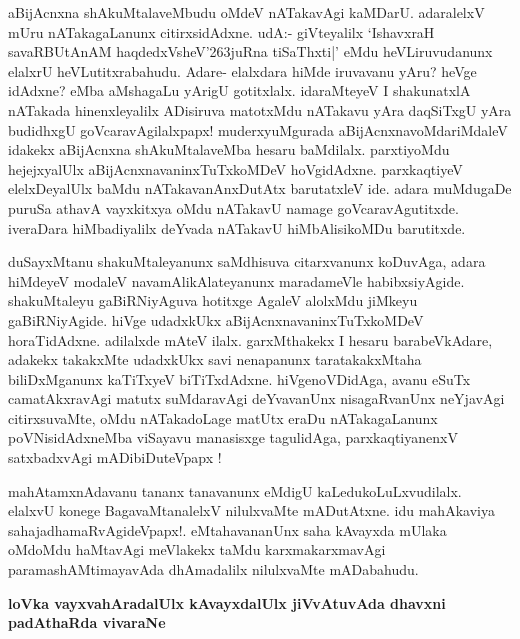 aBijAcnxna shAkuMtalaveMbudu oMdeV nATakavAgi kaMDarU. adaralelxV mUru nATakagaLanunx citirxsidAdxne. udA:- giVteyalilx `IshavxraH savaRBUtAnAM haqdedxVsheV\char'263juRna tiSaThxti|'\label{235} eMdu heVLiruvudanunx elalxrU heVLutitxrabahudu. Adare- elalxdara hiMde iruvavanu yAru? heVge idAdxne? eMba aMshagaLu yArigU gotitxlalx. idaraMteyeV I shakunatxlA nATakada hinenxleyalilx ADisiruva matotxMdu nATakavu yAra daqSiTxgU yAra budidhxgU goVcaravAgilalxpapx! muderxyuMgurada aBijAcnxnavoMdariMdaleV idakekx aBijAcnxna shAkuMtalaveMba hesaru baMdilalx. parxtiyoMdu hejejxyalUlx aBijAcnxnavaninxTuTxkoMDeV hoVgidAdxne. parxkaqtiyeV elelxDeyalUlx baMdu nATakavanAnxDutAtx barutatxleV ide. adara muMdugaDe puruSa athavA vayxkitxya oMdu nATakavU namage goVcaravAgutitxde. iveraDara hiMbadiyalilx deYvada nATakavU hiMbAlisikoMDu barutitxde.

duSayxMtanu shakuMtaleyanunx saMdhisuva citarxvanunx koDuvAga, adara hiMdeyeV modaleV navamAlikAlateyanunx maradameVle habibxsiyAgide. shakuMtaleyu gaBiRNiyAguva hotitxge AgaleV alolxMdu jiMkeyu gaBiRNiyAgide. hiVge udadxkUkx aBijAcnxnavaninxTuTxkoMDeV horaTidAdxne. adilalxde mAteV ilalx. garxMthakekx I hesaru barabeVkAdare, adakekx takakxMte udadxkUkx savi nenapanunx taratakakxMtaha biliDxMganunx kaTiTxyeV biTiTxdAdxne. hiVgenoVDidAga, avanu eSuTx camatAkxravAgi matutx suMdaravAgi deYvavanUnx nisagaRvanUnx neYjavAgi citirxsuvaMte, oMdu nATakadoLage matUtx eraDu nATakagaLanunx poVNisidAdxneMba viSayavu manasisxge tagulidAga, parxkaqtiyanenxV satxbadxvAgi mADibiDuteVpapx !

mahAtamxnAdavanu tananx tanavanunx eMdigU kaLedukoLuLxvudilalx. elalxvU konege BagavaMtanalelxV nilulxvaMte mADutAtxne. idu mahAkaviya sahajadhamaRvAgideVpapx!. eMtahavananUnx saha kAvayxda mUlaka oMdoMdu haMtavAgi meVlakekx taMdu karxmakarxmavAgi paramashAMtimayavAda dhAmadalilx nilulxvaMte mADabahudu.

{\bigskip
\noindent
{\large\bf loVka vayxvahAradalUlx kAvayxdalUlx jiVvAtuvAda dhavxni padAthaRda vivaraNe}}\label{page235}
\medskip

